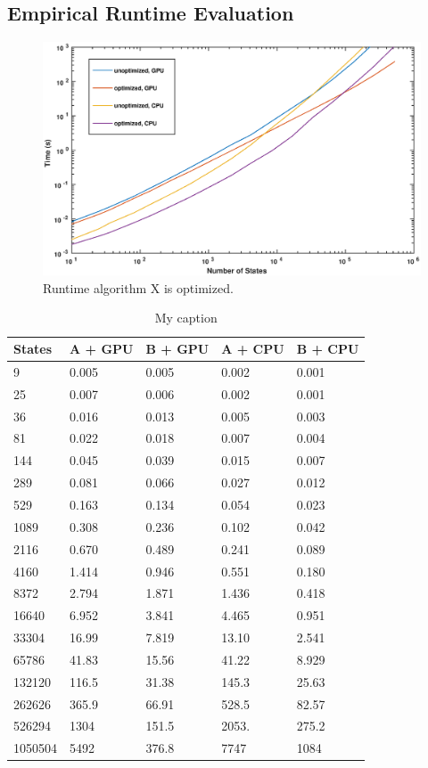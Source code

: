 \subsection{Empirical Runtime Evaluation}

\begin{figure}
\centering
\includegraphics[width=5in]{figures/efficiency2.eps}
\caption{Runtime algorithm X is optimized. } 
\label{fig:desirabilityfunction}
\end{figure}

\begin{table}[]
\centering
\caption{My caption}
\label{my-label}
\begin{tabular}{@{}lllll@{}}
States & A + GPU & B + GPU & A + CPU & B + CPU \\ \midrule
9        & 0.005	& 0.005	& 0.002 & 0.001 \\
25       & 0.007	& 0.006	& 0.002 & 0.001 \\
36       & 0.016	& 0.013	& 0.005 & 0.003 \\
81       & 0.022	& 0.018	& 0.007 & 0.004 \\
144      & 0.045	& 0.039	& 0.015 & 0.007 \\
289      & 0.081	& 0.066	& 0.027 & 0.012 \\
529      & 0.163	& 0.134	& 0.054	& 0.023 \\
1089     & 0.308	& 0.236	& 0.102	& 0.042 \\
2116     & 0.670	& 0.489	& 0.241	& 0.089 \\
4160     & 1.414	& 0.946	& 0.551	& 0.180 \\
8372     & 2.794	& 1.871	& 1.436	& 0.418 \\
16640    & 6.952	& 3.841	& 4.465	& 0.951 \\
33304    & 16.99	& 7.819	& 13.10	& 2.541 \\
65786    & 41.83	& 15.56	& 41.22	& 8.929 \\
132120   & 116.5	& 31.38	& 145.3	& 25.63 \\
262626   & 365.9	& 66.91	& 528.5	& 82.57 \\
526294   & 1304	& 151.5	& 2053.	& 275.2 \\
1050504  & 5492	& 376.8	& 7747	& 1084
\end{tabular}
\end{table}
